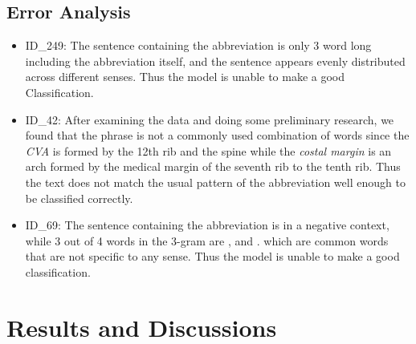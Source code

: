\documentclass{article}
\begin{document}
    \subsection{Error Analysis}
    \begin{itemize}
        \item ID\_249: The sentence containing the abbreviation is only 3 word long including the abbreviation itself, and the sentence appears evenly distributed across different senses. Thus the model is unable to make a good Classification.
        \item ID\_42: After examining the data and doing some preliminary research, we found that the phrase  is not a commonly used combination of words since the \textit{CVA} is formed by the 12th rib and the spine while the \textit{costal margin} is an arch formed by the medical margin of the seventh rib to the tenth rib. Thus the text does not match the usual pattern of the abbreviation well enough to be classified correctly.
        \item ID\_69: The sentence containing the abbreviation is in a negative context, while 3 out of 4 words in the 3-gram are ,  and . which are common words that are not specific to any sense. Thus the model is unable to make a good classification.
    \end{itemize}
    \section{Results and Discussions}
    
\end{document}
